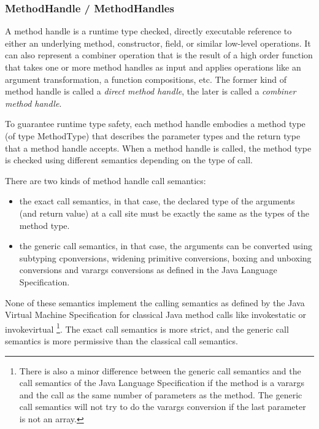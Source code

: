 \documentclass{sig-alternate}
\begin{document}
    \subsubsection{MethodHandle / MethodHandles}
      \label{MH}

      A method handle is a runtime type checked, directly executable reference to
      either an underlying method, constructor, field, or similar low-level operations.
      It can also represent a combiner operation that is the result of a high order function
      that takes one or more method handles as input and applies operations like an argument transformation,
      a function compositions, etc.
      The former kind of method handle is called a {\it direct method handle},
      the later is called a {\it combiner method handle}.

      To guarantee runtime type safety, each method handle embodies a method type (of type MethodType)
      that describes the parameter types and the return type that a method handle accepts.
      When a method handle is called, the method type is checked using different semantics depending on the
      type of call.

      There are two kinds of method handle call semantics:
      \begin{itemize}
        \item the exact call semantics, in that case, the declared type of the arguments (and return value) at a call site
              must be exactly the same as the types of the method type.
        \item the generic call semantics, in that case, the arguments can be converted using subtyping cponversions,
              widening primitive conversions, boxing and unboxing conversions and varargs conversions
              as defined in the Java Language Specification.
      \end{itemize}
      None of these semantics implement the calling semantics as defined by the Java Virtual Machine Specification
      for classical Java method calls like invokestatic or invokevirtual
      \footnote{There is also a minor difference between the generic call semantics and the call semantics of
        the Java Language Specification if the method is a varargs and the call as the same number of parameters as the method.
        The generic call semantics will not try to do the varargs conversion if the last parameter is not an array.}.
      The exact call semantics is more strict, and the generic call semantics is more permissive than the classical call semantics.
\end{document}
